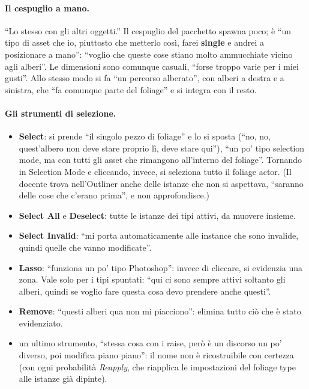 \paragraph{Il cespuglio a mano.} ``Lo stesso con gli altri oggetti.'' Il cespuglio del
pacchetto spawna poco; è ``un tipo di asset che io, piuttosto che metterlo così, farei
\textbf{single} e andrei a posizionare a mano'': ``voglio che queste cose stiano molto
ammucchiate vicino agli alberi''. Le dimensioni sono comunque casuali, ``forse troppo varie
per i miei gusti''. Allo stesso modo si fa ``un percorso alberato'', con alberi a destra e a
sinistra, che ``fa comunque parte del foliage'' e si integra con il resto.

\paragraph{Gli strumenti di selezione.}
\begin{itemize}
  \item \textbf{Select}: si prende ``il singolo pezzo di foliage'' e lo si sposta (``no, no,
        quest'albero non deve stare proprio lì, deve stare qui''), ``un po' tipo selection mode,
        ma con tutti gli asset che rimangono all'interno del foliage''. Tornando in Selection
        Mode e cliccando, invece, si seleziona tutto il foliage actor. (Il docente trova
        nell'Outliner anche delle istanze che non si aspettava, ``saranno delle cose che
        c'erano prima'', e non approfondisce.)
  \item \textbf{Select All} e \textbf{Deselect}: tutte le istanze dei tipi attivi, da
        muovere insieme.
  \item \textbf{Select Invalid}: ``mi porta automaticamente alle instance che sono invalide,
        quindi quelle che vanno modificate''.
  \item \textbf{Lasso}: ``funziona un po' tipo Photoshop'': invece di cliccare, si evidenzia
        una zona. Vale solo per i tipi spuntati: ``qui ci sono sempre attivi soltanto gli
        alberi, quindi se voglio fare questa cosa devo prendere anche questi''.
  \item \textbf{Remove}: ``questi alberi qua non mi piacciono'': elimina tutto ciò che è stato
        evidenziato.
  \item un ultimo strumento, ``stessa cosa con i raise, però è un discorso un po' diverso, poi
        modifica piano piano'': il nome non è ricostruibile con certezza (con ogni probabilità
        \emph{Reapply}, che riapplica le impostazioni del foliage type alle istanze già
        dipinte).
\end{itemize}

